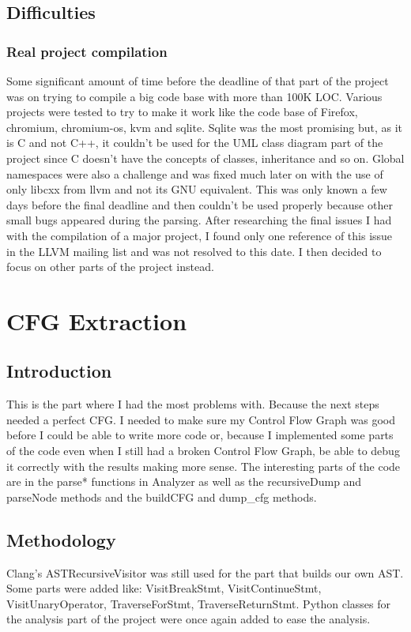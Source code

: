 \documentclass[conference,compsoc]{IEEEtran}
\begin{document}
\subsection{Difficulties}
\subsubsection{Real project compilation}
 Some significant amount of time before the deadline of that part of the project was on trying
 to compile a big code base with more than 100K LOC. Various projects were tested to try to make it
 work like the code base of Firefox, chromium, chromium-os, kvm and sqlite. Sqlite was the most
 promising but, as it is C and not C++, it couldn't be used for the UML class diagram part of the
 project since C doesn't have the concepts of classes, inheritance and so on. Global namespaces
 were also a challenge and was fixed much later on with the use of only libcxx from llvm and not
 its GNU equivalent. This was only known a few days before the final deadline and then couldn't
 be used properly because other small bugs appeared during the parsing. After researching the final
 issues I had with the compilation of a major project, I found only one reference of this issue
 in the LLVM mailing list and was not resolved to this date. I then decided to focus on other parts
 of the project instead.

\section{CFG Extraction}
\subsection{Introduction}
This is the part where I had the most problems with. Because the next steps needed a perfect CFG.
 I needed to make sure my Control Flow Graph was good before I could be able to write more code or,
 because I implemented some parts of the code even when I still had a broken Control Flow Graph, be able
 to debug it correctly with the results making more sense. The interesting parts of the code are in the parse* functions
 in Analyzer as well as the recursiveDump and parseNode methods and the buildCFG and dump\_cfg methods.

\subsection{Methodology}
 Clang's ASTRecursiveVisitor was still used for the part
 that builds our own AST. Some parts were added like: VisitBreakStmt,
 VisitContinueStmt, VisitUnaryOperator, TraverseForStmt, TraverseReturnStmt.
 Python classes for the analysis part of the project
 were once again added to ease the analysis.
\end{document}
